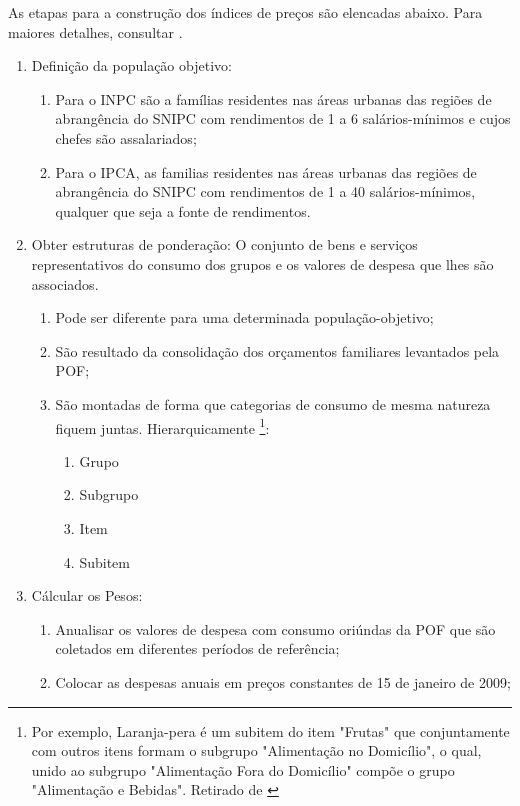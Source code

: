 \documentclass[twoside,a4paper,11pt]{report}
\begin{document}
As etapas para a construção dos índices de preços são elencadas abaixo. Para maiores detalhes, consultar \citet{ibgemetodos}.

\begin{enumerate}
  \item Definição da população objetivo: 
  \begin{enumerate} 
    \item Para o INPC são a famílias residentes nas áreas urbanas das regiões de abrangência do SNIPC com rendimentos de 1 a 6 salários-mínimos e cujos chefes são assalariados; 
    \item Para o IPCA, as familias residentes nas áreas urbanas das regiões de abrangência do SNIPC com rendimentos de 1 a 40 salários-mínimos, qualquer que seja a fonte de rendimentos.
  \end{enumerate}
  \item Obter estruturas de ponderação: O conjunto de bens e serviços representativos do consumo dos grupos e os valores de despesa que lhes são associados. 
  \begin{enumerate}
    \item Pode ser diferente para uma determinada população-objetivo;
    \item São resultado da consolidação dos orçamentos familiares levantados pela POF;
    \item São montadas de forma que categorias de consumo de mesma natureza fiquem juntas. Hierarquicamente \footnote[2]{Por exemplo, Laranja-pera é um subitem do item "Frutas" que conjuntamente com outros itens formam o subgrupo "Alimentação no Domicílio", o qual, unido ao subgrupo "Alimentação Fora do Domicílio" compõe o grupo "Alimentação e Bebidas". Retirado de \citet{ibgemetodos}}: 
    \begin{enumerate}
      \item Grupo
      \item Subgrupo
      \item Item
      \item Subitem
    \end{enumerate}
  \end{enumerate}
  \item Cálcular os Pesos:
  \begin{enumerate}
    \item Anualisar os valores de despesa com consumo oriúndas da POF que são coletados em diferentes períodos de referência;
    \item Colocar as despesas anuais em preços constantes de 15 de janeiro de 2009;

\end{enumerate}
\end{enumerate}
\end{document}
